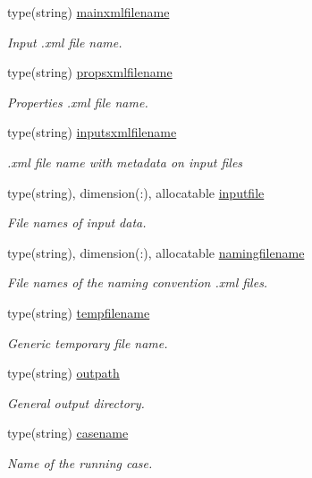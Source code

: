\begin{DoxyCompactItemize}
\item 
type(string) \mbox{\hyperlink{structsimulationglobals__mod_1_1filenames__t_a5af6fa9ef520239ea544e0241a03259d}{mainxmlfilename}}
\begin{DoxyCompactList}\small\item\em Input .xml file name. \end{DoxyCompactList}\item 
type(string) \mbox{\hyperlink{structsimulationglobals__mod_1_1filenames__t_aa68e6aa970dcc2fb6ef62f5c20373948}{propsxmlfilename}}
\begin{DoxyCompactList}\small\item\em Properties .xml file name. \end{DoxyCompactList}\item 
type(string) \mbox{\hyperlink{structsimulationglobals__mod_1_1filenames__t_aef0d56123bd40e7f6a485680bad46345}{inputsxmlfilename}}
\begin{DoxyCompactList}\small\item\em .xml file name with metadata on input files \end{DoxyCompactList}\item 
type(string), dimension(\+:), allocatable \mbox{\hyperlink{structsimulationglobals__mod_1_1filenames__t_a28b7d9c5da2394c7a3ec6252bd95d9e4}{inputfile}}
\begin{DoxyCompactList}\small\item\em File names of input data. \end{DoxyCompactList}\item 
type(string), dimension(\+:), allocatable \mbox{\hyperlink{structsimulationglobals__mod_1_1filenames__t_ab9bfe3490032ac0fe0ff585f4ccf81ba}{namingfilename}}
\begin{DoxyCompactList}\small\item\em File names of the naming convention .xml files. \end{DoxyCompactList}\item 
type(string) \mbox{\hyperlink{structsimulationglobals__mod_1_1filenames__t_a65117f3cf40366162812c184decc8298}{tempfilename}}
\begin{DoxyCompactList}\small\item\em Generic temporary file name. \end{DoxyCompactList}\item 
type(string) \mbox{\hyperlink{structsimulationglobals__mod_1_1filenames__t_aa8af9fb10dcd5d2f5dfc0fe299a16755}{outpath}}
\begin{DoxyCompactList}\small\item\em General output directory. \end{DoxyCompactList}\item 
type(string) \mbox{\hyperlink{structsimulationglobals__mod_1_1filenames__t_a5a53822ea60d4941a19739cacb957469}{casename}}
\begin{DoxyCompactList}\small\item\em Name of the running case. \end{DoxyCompactList}\end{DoxyCompactItemize}



